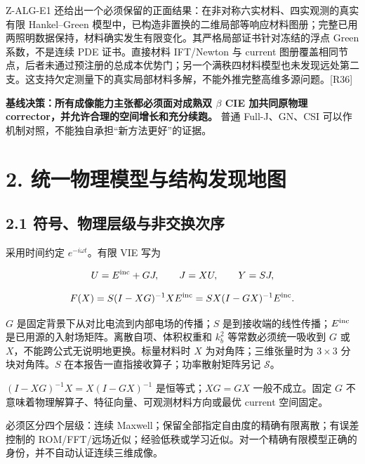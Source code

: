 \documentclass[11pt,a4paper]{article}
\begin{document}
Z-ALG-E1
还给出一个必须保留的正面结果：在非对称六实材料、四实观测的真实有限
Hankel--Green
模型中，已构造非置换的二维局部等响应材料图册；完整已用两照明数据保持，材料确实发生有限变化。其严格局部证书针对冻结的浮点
Green 系数，不是连续 PDE 证书。直接材料 IFT/Newton 与 current
图册覆盖相同节点，后者未通过预注册的总成本优势门；另一个满秩四材料模型也未发现远处第二支。这支持欠定测量下的真实局部材料多解，不能外推完整高维多源问题。{[}R36{]}

\textbf{基线决策：所有成像能力主张都必须面对成熟双 \(\beta\) CIE
加共同原物理 corrector，并允许合理的空间增长和充分续跑。} 普通
Full-J、GN、CSI 可以作机制对照，不能独自承担``新方法更好''的证据。

\hypertarget{ux7edfux4e00ux7269ux7406ux6a21ux578bux4e0eux7ed3ux6784ux53d1ux73b0ux5730ux56fe}{%
\section{2.
统一物理模型与结构发现地图}\label{ux7edfux4e00ux7269ux7406ux6a21ux578bux4e0eux7ed3ux6784ux53d1ux73b0ux5730ux56fe}}

\hypertarget{ux7b26ux53f7ux7269ux7406ux5c42ux7ea7ux4e0eux975eux4ea4ux6362ux6b21ux5e8f}{%
\subsection{2.1
符号、物理层级与非交换次序}\label{ux7b26ux53f7ux7269ux7406ux5c42ux7ea7ux4e0eux975eux4ea4ux6362ux6b21ux5e8f}}

采用时间约定 \(e^{-i\omega t}\)。有限 VIE 写为

\[
U=E^{\rm inc}+GJ,\qquad J=XU,\qquad Y=SJ,
\]

\[
F(X)=S(I-XG)^{-1}XE^{\rm inc}
=SX(I-GX)^{-1}E^{\rm inc}.
\]

\(G\) 是固定背景下从对比电流到内部电场的传播；\(S\)
是到接收端的线性传播；\(E^{\rm inc}\)
是已用源的入射场矩阵。离散自项、体积权重和 \(k_b^2\)
等常数必须统一吸收到 \(G\) 或 \(X\)，不能跨公式无说明地更换。标量材料时
\(X\) 为对角阵；三维张量时为 \(3\times3\) 分块对角阵。\(S\)
在本报告一直指接收算子；功率散射矩阵另记 \(\mathscr S\)。

\((I-XG)^{-1}X=X(I-GX)^{-1}\) 是恒等式；\(XG=GX\) 一般不成立。固定 \(G\)
不意味着物理解算子、特征向量、可观测材料方向或最优 current 空间固定。

必须区分四个层级：连续
Maxwell；保留全部指定自由度的精确有限离散；有误差控制的
ROM/FFT/远场近似；经验低秩或学习近似。对一个精确有限模型正确的身份，并不自动认证连续三维成像。
\end{document}
